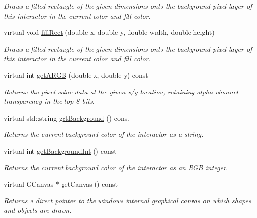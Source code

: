 \begin{DoxyCompactItemize}
\begin{DoxyCompactList}\small\item\em Draws a filled rectangle of the given dimensions onto the background pixel layer of this interactor in the current color and fill color. \end{DoxyCompactList}\item 
virtual void \mbox{\hyperlink{classsgl_1_1GDrawingSurface_aac3ae7d3aee950de78eca0e108352254}{fill\+Rect}} (double x, double y, double width, double height)
\begin{DoxyCompactList}\small\item\em Draws a filled rectangle of the given dimensions onto the background pixel layer of this interactor in the current color and fill color. \end{DoxyCompactList}\item 
virtual int \mbox{\hyperlink{classsgl_1_1GDrawingSurface_ae394d39f20476570e083918d991c25bd}{get\+A\+R\+GB}} (double x, double y) const
\begin{DoxyCompactList}\small\item\em Returns the pixel color data at the given x/y location, retaining alpha-\/channel transparency in the top 8 bits. \end{DoxyCompactList}\item 
virtual std\+::string \mbox{\hyperlink{classsgl_1_1GDrawingSurface_a808e22cc1fdfbecf71ed8c64ef4600e0}{get\+Background}} () const
\begin{DoxyCompactList}\small\item\em Returns the current background color of the interactor as a string. \end{DoxyCompactList}\item 
virtual int \mbox{\hyperlink{classsgl_1_1GDrawingSurface_a9e827257a55cb8cf4d9de2ec6bcfd7a0}{get\+Background\+Int}} () const
\begin{DoxyCompactList}\small\item\em Returns the current background color of the interactor as an R\+GB integer. \end{DoxyCompactList}\item 
virtual \mbox{\hyperlink{classsgl_1_1GCanvas}{G\+Canvas}} $\ast$ \mbox{\hyperlink{classsgl_1_1GWindow_a7aed3237105aa56033642252b3b1445e}{get\+Canvas}} () const
\begin{DoxyCompactList}\small\item\em Returns a direct pointer to the window\textquotesingle{}s internal graphical canvas on which shapes and objects are drawn. \end{DoxyCompactList}\item 

\end{DoxyCompactItemize}
